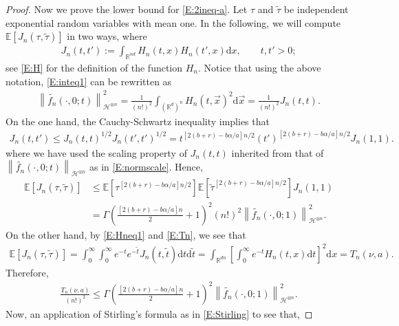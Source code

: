 \documentclass[a4paper,11pt]{article}
\numberwithin{equation}{section}
\numberwithin{equation}{section}
\theoremstyle{plain}
\theoremstyle{definition}
\newcommand{\ud}{\ensuremath{\mathrm{d} }}
\newcommand{\Norm}[1]{\left\|  #1   \right\|}
\newcommand{\R}{\mathbb{R}}
\begin{document}
\begin{proof}
  Now we prove the lower bound for \eqref{E:2ineq-a}. Let $\tau$ and $\widetilde{\tau}$ be
  independent exponential random variables with mean one. In the following, we will compute
  $\mathbb{E}[J_n(\tau,\widetilde{\tau})]$ in two ways, where
  \begin{align*}
    J_n(t,t') := \int_{\R^{nd}} H_n(t,x)H_n(t',x) \ud x, \qquad t,t'>0;
  \end{align*}
  see \eqref{E:H} for the definition of the function $H_n$. Notice that using the above notation,
  \eqref{E:inteq1} can be rewritten as
  \begin{align*}
    \Norm{\widetilde{f_n}(\cdot,0;t)}_{\mathcal{H}^{\otimes n}}^2 = \frac{1}{(n!)^2} \int_{(\R^{d})^n} H_n(t,\vec{x})^2\ud \vec{x} = \frac{1}{(n!)^2} J_n(t,t).
  \end{align*}
  On the one hand, the Cauchy-Schwartz inequality implies that
  \begin{align*}
    J_n(t,t') \le J_n(t,t)^{1/2}J_n(t',t')^{1/2} =  t^{[2(b + r ) -b \alpha / a]n/2} ( t' )^{[2(b + r ) -b \alpha / a]n/2} J_n(1,1).
  \end{align*}
  where we have used the scaling property of $J_n(t,t)$ inherited from that of
  $\Norm{\widetilde{f_n}(\cdot,0;t)}_{\mathcal{H}^{\otimes n}}$ as in \eqref{E:normscale}. Hence,
  \begin{align*}
    \mathbb{E}[J_n(\tau,\widetilde{\tau})]
    & \le \mathbb{E}\left[  {\tau}^{[2(b + r ) -b \alpha / a]n/2} \right] \mathbb{E}\left[  {\widetilde{\tau}}^{[2(b + r ) -b \alpha / a]n/2} \right]J_n(1,1) \\
    & = \Gamma\left( \frac{[2(b + r ) -b \alpha / a]n}{2} +1 \right)^2 (n!)^2  \Norm{\widetilde{f_n}(\cdot,0;1) }_{ \mathcal{H}^{\otimes n} }^2.
  \end{align*}
  On the other hand, by \eqref{E:Hneq1} and \eqref{E:Tn}, we see that
  \begin{align*}
    \mathbb{E}[J_n(\tau,\widetilde{\tau})]
    = \int_0^\infty \int_0^\infty e^{-t}e^{-\widetilde{t}}J_n(t,\widetilde{t}) \ud t \ud \widetilde{t}
    = \int_{\R^{dn}}\left[ \int_0^\infty e^{-t}H_n(t,x) \ud t \right]^2 \ud x
    = T_n\left(\nu,a\right).
  \end{align*}
  Therefore,
  \begin{align} \label{E:2lowbd}
    \frac{T_n(\nu,a)}{(n!)^2} \le \Gamma\left( \frac{[2(b + r ) -b \alpha / a]n}{2} +1 \right)^2
    \Norm{ \widetilde{f_n}(\cdot,0;1) }_{ \mathcal{H}^{\otimes n} }^2 .
  \end{align}
  Now, an application of Stirling's formula as in \eqref{E:Stirling} to see that,

\end{proof}
\end{document}
